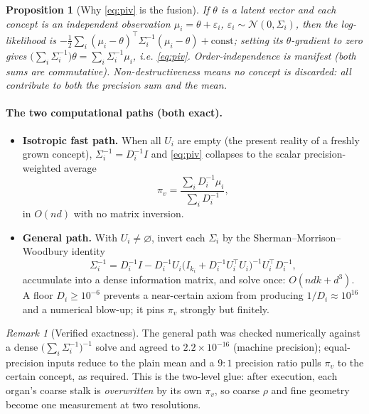 \documentclass[11pt]{article}
\theoremstyle{definition}
\theoremstyle{plain}
\newtheorem{proposition}[definition]{Proposition}
\theoremstyle{remark}
\newtheorem{remark}[definition]{Remark}
\begin{document}
\begin{proposition}[Why \eqref{eq:piv} is the fusion]
If $\theta$ is a latent vector and each concept is an independent observation
$\mu_i=\theta+\varepsilon_i$, $\varepsilon_i\sim\mathcal N(0,\Sigma_i)$, then the
log-likelihood is
$-\tfrac12\sum_i(\mu_i-\theta)^\top\Sigma_i^{-1}(\mu_i-\theta)+\mathrm{const}$; setting
its $\theta$-gradient to zero gives
$\big(\sum_i\Sigma_i^{-1}\big)\theta=\sum_i\Sigma_i^{-1}\mu_i$, i.e. \eqref{eq:piv}.
Order-independence is manifest (both sums are commutative). Non-destructiveness means
no concept is discarded: all contribute to both the precision sum and the mean.
\end{proposition}

\paragraph{The two computational paths (both exact).}
\begin{itemize}[nosep]
  \item \textbf{Isotropic fast path.} When all $U_i$ are empty (the present reality of
  a freshly grown concept), $\Sigma_i^{-1}=D_i^{-1}I$ and \eqref{eq:piv} collapses to
  the scalar precision-weighted average
  \begin{equation}\label{eq:isopath}
  \pi_v=\frac{\sum_i D_i^{-1}\mu_i}{\sum_i D_i^{-1}},
  \end{equation}
  in $O(nd)$ with no matrix inversion.
  \item \textbf{General path.} With $U_i\neq\varnothing$, invert each
  $\Sigma_i$ by the Sherman--Morrison--Woodbury identity
  \begin{equation}\label{eq:woodbury}
  \Sigma_i^{-1}=D_i^{-1}I-D_i^{-1}U_i\big(I_{k_i}+D_i^{-1}U_i^\top U_i\big)^{-1}U_i^\top D_i^{-1},
  \end{equation}
  accumulate into a dense information matrix, and solve once: $O(nd k+d^3)$. A floor
  $D_i\ge 10^{-6}$ prevents a near-certain axiom from producing $1/D_i\approx10^{16}$
  and a numerical blow-up; it pins $\pi_v$ strongly but finitely.
\end{itemize}

\begin{remark}[Verified exactness]
The general path was checked numerically against a dense
$\big(\sum_i\Sigma_i^{-1}\big)^{-1}$ solve and agreed to $2.2\times10^{-16}$
(machine precision); equal-precision inputs reduce to the plain mean and a $9{:}1$
precision ratio pulls $\pi_v$ to the certain concept, as required. This is the
two-level glue: after execution, each organ's coarse stalk is \emph{overwritten} by
its own $\pi_v$, so coarse $\rho$ and fine geometry become one measurement at two
resolutions.
\end{remark}
\end{document}

